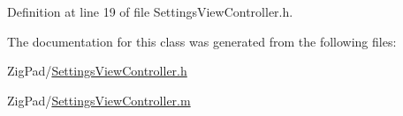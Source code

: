Definition at line 19 of file SettingsViewController.h.



The documentation for this class was generated from the following files:\begin{DoxyCompactItemize}
\item 
ZigPad/\hyperlink{_settings_view_controller_8h}{SettingsViewController.h}\item 
ZigPad/\hyperlink{_settings_view_controller_8m}{SettingsViewController.m}\end{DoxyCompactItemize}
